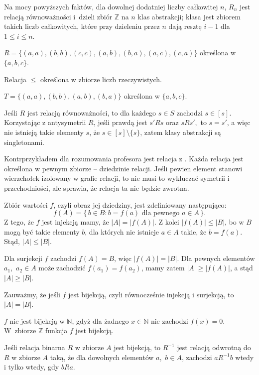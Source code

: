 Na mocy powyższych faktów, dla dowolnej dodatniej liczby całkowitej $n$, $R_n$ jest relacją równoważności i~dzieli zbiór $\mathbb{Z}$ na $n$ klas abstrakcji;  klasa jest zbiorem takich liczb całkowitych, które przy dzieleniu przez $n$ dają resztę $i-1$ dla $1\le i\le n$.

\exercise %
\subexercise
$R=\bigl\{(a,a),(b,b),(c,c),(a,b),(b,a),(a,c),(c,a)\bigr\}$ określona w $\{a,b,c\}$.

\subexercise
Relacja $\le$ określona w zbiorze liczb rzeczywistych.

\subexercise
$T=\bigl\{(a,a),(b,b),(a,b),(b,a)\bigr\}$ określona w $\{a,b,c\}$.

\exercise %
Jeśli $R$ jest relacją równoważności, to dla każdego $s\in S$ zachodzi $s\in[s]$. Korzystając z antysymetrii $R$, jeśli prawdą jest $s'Rs$ oraz $sRs',$ to $s=s'$, a więc nie istnieją takie elementy $s$, że $s\in[s]\setminus\{s\}$, zatem klasy abstrakcji są singletonami.

\exercise %
Kontrprzykładem dla rozumowania profesora jest relacja z . Każda relacja jest określona w pewnym zbiorze -- dziedzinie relacji. Jeśli pewien element stanowi wierzchołek izolowany w grafie relacji, to nie musi to wykluczać symetrii i przechodniości, ale sprawia, że relacja ta nie będzie zwrotna.


\exercise %
\subexercise
Zbiór wartości $f$, czyli obraz jej dziedziny, jest zdefiniowany następująco:
\[
	f(A) = \bigl\{\,b\in B:b=f(a)\text{ dla pewnego $a\in A$}\,\bigr\}.
\]
Z tego, że $f$ jest injekcją mamy, że $|A|=|f(A)|$. Z kolei $|f(A)|\le|B|$, bo w $B$ mogą być takie elementy $b$, dla których nie istnieje $a\in A$ takie, że $b=f(a)$. Stąd, $|A|\le|B|$.

\subexercise
Dla surjekcji $f$ zachodzi $f(A)=B$, więc $|f(A)|=|B|$. Dla pewnych elementów $a_1$,~$a_2\in A$ może zachodzić $f(a_1)=f(a_2)$, mamy zatem $|A|\ge|f(A)|$, a stąd $|A|\ge|B|$.

Zauważmy, że jeśli $f$ jest bijekcją, czyli równocześnie injekcją i surjekcją, to $|A|=|B|$.

\exercise %
$f$ nie jest bijekcją w $\mathbb{N}$, gdyż dla żadnego $x\in\mathbb{N}$ nie zachodzi $f(x)=0$. W~zbiorze $\mathbb{Z}$ funkcja $f$ jest bijekcją.

\exercise %
Jeśli relacja binarna $R$ w zbiorze $A$ jest bijekcją, to $R^{-1}$ jest relacją odwrotną do $R$ w zbiorze $A$ taką, że dla dowolnych elementów $a$,~$b\in A$, zachodzi $aR^{-1}b$ wtedy i tylko wtedy, gdy $bRa$.


